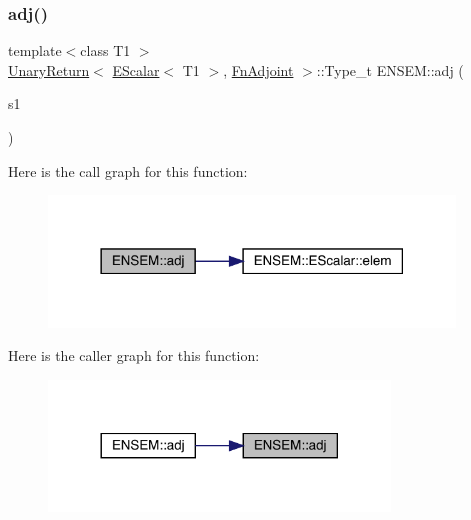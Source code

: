 \subsubsection{\texorpdfstring{adj()}{adj()}}
{\footnotesize\ttfamily template$<$class T1 $>$ \\
\mbox{\hyperlink{structENSEM_1_1UnaryReturn}{Unary\+Return}}$<$ \mbox{\hyperlink{classENSEM_1_1EScalar}{E\+Scalar}}$<$ T1 $>$, \mbox{\hyperlink{structENSEM_1_1FnAdjoint}{Fn\+Adjoint}} $>$\+::Type\+\_\+t E\+N\+S\+E\+M\+::adj (\begin{DoxyParamCaption}\item[{const \mbox{\hyperlink{classENSEM_1_1EScalar}{E\+Scalar}}$<$ T1 $>$ \&}]{s1 }\end{DoxyParamCaption})\hspace{0.3cm}{\ttfamily [inline]}}

Here is the call graph for this function\+:
\nopagebreak
\begin{figure}[H]
\begin{center}
\leavevmode
\includegraphics[width=306pt]{d4/dca/group__escalar_ga51071562edd203962f48e4b44f0c0a0c_cgraph}
\end{center}
\end{figure}
Here is the caller graph for this function\+:
\nopagebreak
\begin{figure}[H]
\begin{center}
\leavevmode
\includegraphics[width=257pt]{d4/dca/group__escalar_ga51071562edd203962f48e4b44f0c0a0c_icgraph}
\end{center}
\end{figure}
\mbox{\label{group__escalar_ga8cef36c4e2779c7d7dbf64b9500b053c}} 
